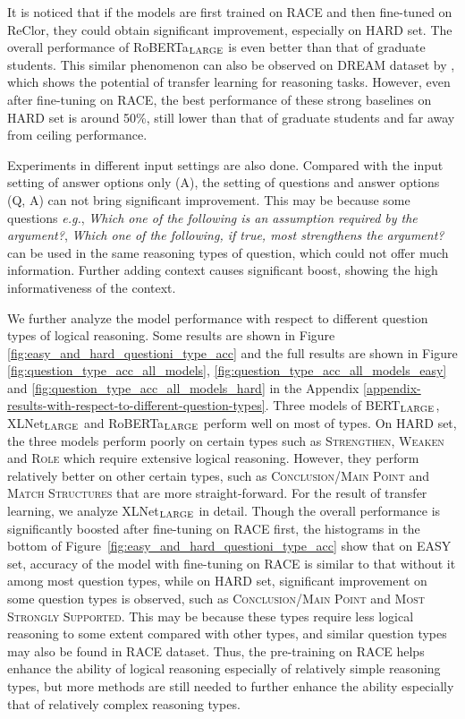 \documentclass{article} \usepackage{iclr2020_conference,times}
\newcommand\bertlarge{BERT$_{\small \textsc{LARGE}}$\xspace}
\newcommand\xlnetlarge{XLNet$_{\small \textsc{LARGE}}$\xspace}
\newcommand\robertalarge{RoBERTa$_{\small \textsc{LARGE}}$\xspace}
\begin{document}
It is noticed that if the models are first trained on RACE and then fine-tuned on ReClor, they could obtain significant improvement, especially on HARD set. The overall performance of \robertalarge is even better than that of graduate students. This similar phenomenon can also be observed on DREAM dataset \citep{sun2019dream} by \citet{jin2019mmm}, which shows the potential of transfer learning for reasoning tasks. However, even after fine-tuning on RACE, the best performance of these strong baselines on HARD set is around 50\%, still lower than that of graduate students and far away from ceiling performance.  

Experiments in different input settings are also done. Compared with the input setting of answer options only (A), the setting of questions and answer options (Q, A) can not bring significant improvement. This may be because some questions \textit{e.g.}, \textit{Which one of the following is an assumption required by the argument?}, \textit{Which one of the following, if true, most strengthens the argument?} can be used in the same reasoning types of question, which could not offer much information. Further adding context causes significant boost, showing the high informativeness of the context. 

We further analyze the model performance with respect to different question types of logical reasoning. Some results are shown in Figure \ref{fig:easy_and_hard_questioni_type_acc} and the full results are shown in Figure \ref{fig:question_type_acc_all_models}, \ref{fig:question_type_acc_all_models_easy} and \ref{fig:question_type_acc_all_models_hard} in the Appendix \ref{appendix-results-with-respect-to-different-question-types}. Three models of \bertlarge, \xlnetlarge and \robertalarge perform well on most of types. On HARD set, the three models perform poorly on certain types such as \textsc{Strengthen}, \textsc{Weaken} and \textsc{Role} which require extensive logical reasoning. However, they perform relatively better on other certain types, such as \textsc{Conclusion/Main Point} and \textsc{Match Structures} that are more straight-forward. For the result of transfer learning, we analyze \xlnetlarge in detail. Though the overall performance is significantly boosted after fine-tuning on RACE first, the histograms in the bottom of Figure~\ref{fig:easy_and_hard_questioni_type_acc} show that on EASY set, accuracy of the model with fine-tuning on RACE is similar to that without it among most question types, while on HARD set, significant improvement on some question types is observed, such as \textsc{Conclusion/Main Point} and \textsc{Most Strongly Supported}. This may be because these types require less logical reasoning to some extent compared with other types, and similar question types may also be found in RACE dataset. Thus, the pre-training on RACE helps enhance the ability of logical reasoning especially of relatively simple reasoning types, but more methods are still needed to further enhance the ability especially that of relatively complex reasoning types. 
\end{document}
